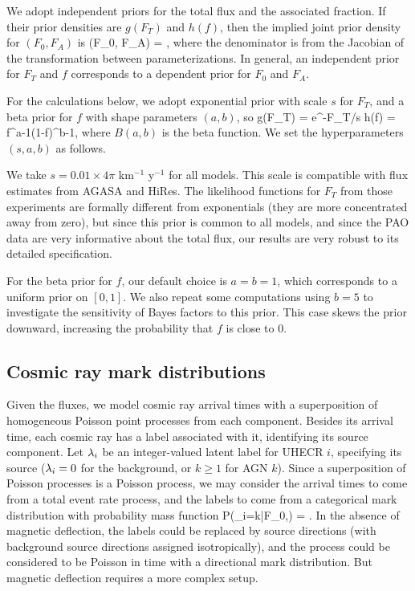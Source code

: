 We adopt independent priors for the total flux and the associated fraction.
If their prior densities are $g(F_T)$ and $h(f)$, then the implied
joint prior density for $(F_0,F_A)$ is
\be
\pi(F_0, F_A) =
  ,
\label{FF-prior}
\ee
where the denominator is from the Jacobian of the transformation between
parameterizations.  In general, an independent prior for $F_T$ and $f$
corresponds to a dependent prior for $F_0$ and $F_A$.

For the calculations below, we adopt exponential prior with scale $s$ for
$F_T$, and a beta prior for $f$ with shape parameters $(a,b)$, so
\be
g(F_T) = e^{-F_T/s}
\quad{}\quad
h(f) =  f^{a-1}(1-f)^{b-1},
\label{exp-beta}
\ee
where $B(a,b)$ is the beta function.  We set the hyperparameters $(s,a,b)$
as follows.

We take $s = 0.01\times 4\pi$ km$^{-1}$ y$^{-1}$ for all models.  This scale
is compatible with flux estimates from AGASA and HiRes.  The likelihood
functions for $F_T$ from those experiments are formally different from
exponentials (they are more concentrated away from zero), but since this
prior is common to all models, and since the PAO data are very informative
about the total flux, our results are very robust to its detailed
specification.

For the beta prior for $f$, our default choice is $a=b=1$, which corresponds
to a uniform prior on $[0,1]$.  We also repeat some computations using $b=5$
to investigate the sensitivity of Bayes factors to this prior.  This case
skews the prior downward, increasing the probability that $f$ is close to 0.

\subsection{Cosmic ray mark distributions}

Given the fluxes, we model cosmic ray arrival times with a superposition of
homogeneous Poisson point processes from each component.  Besides its
arrival time, each cosmic ray has a label associated with it, identifying
its source component. Let $\lambda_i$ be an integer-valued latent label for
UHECR $i$, specifying its source ($\lambda_i = 0$ for the background, or
$k \ge 1$ for AGN $k$).  Since a superposition of Poisson processes is a
Poisson process, we may consider the arrival times to come from a total
event rate process, and the labels to come from a categorical mark
distribution with probability mass function
\be
P(\lambda_i=k|F_0,\Fvec) = .
\label{label-pmf}
\ee
In the absence of magnetic deflection, the labels could be replaced by
source directions (with background source directions assigned
isotropically), and the process could be considered to be Poisson in time
with a directional mark distribution.  But magnetic deflection requires a
more complex setup.

